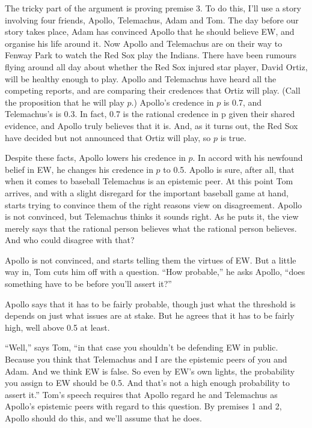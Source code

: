 \documentclass[
  11pt,
  letterpaper,
  DIV=11,
  numbers=noendperiod,
  oneside]{scrartcl}
\begin{document}
The tricky part of the argument is proving premise 3. To do this, I'll
use a story involving four friends, Apollo, Telemachus, Adam and Tom.
The day before our story takes place, Adam has convinced Apollo that he
should believe EW, and organise his life around it. Now Apollo and
Telemachus are on their way to Fenway Park to watch the Red Sox play the
Indians. There have been rumours flying around all day about whether the
Red Sox injured star player, David Ortiz, will be healthy enough to
play. Apollo and Telemachus have heard all the competing reports, and
are comparing their credences that Ortiz will play. (Call the
proposition that he will play \(p\).) Apollo's credence in \(p\) is 0.7,
and Telemachus's is 0.3. In fact, 0.7 is the rational credence in p
given their shared evidence, and Apollo truly believes that it
is. And, as it turns out, the Red
Sox have decided but not announced that Ortiz will play, so \(p\) is
true.

Despite these facts, Apollo lowers his credence in \(p\). In accord with
his newfound belief in EW, he changes his credence in \(p\) to 0.5.
Apollo is sure, after all, that when it comes to baseball Telemachus is
an epistemic peer. At this point Tom arrives, and with a slight
disregard for the important baseball game at hand, starts trying to
convince them of the right reasons view on disagreement. Apollo is not
convinced, but Telemachus thinks it sounds right. As he puts it, the
view merely says that the rational person believes what the rational
person believes. And who could disagree with that?

Apollo is not convinced, and starts telling them the virtues of EW. But
a little way in, Tom cuts him off with a question. ``How probable,'' he
asks Apollo, ``does something have to be before you'll assert it?''

Apollo says that it has to be fairly probable, though just what the
threshold is depends on just what issues are at stake. But he agrees
that it has to be fairly high, well above 0.5 at least.

``Well,'' says Tom, ``in that case you shouldn't be defending EW in
public. Because you think that Telemachus and I are the epistemic peers
of you and Adam. And we think EW is false. So even by EW's own lights,
the probability you assign to EW should be 0.5. And that's not a high
enough probability to assert it.'' Tom's speech requires that Apollo
regard he and Telemachus as Apollo's epistemic peers with regard to this
question. By premises 1 and 2, Apollo should do this, and we'll assume
that he does.
\end{document}
